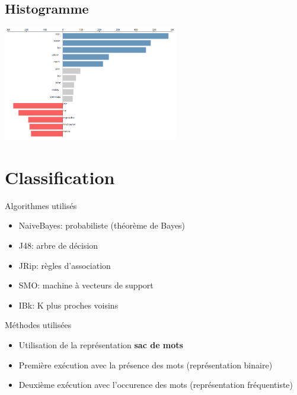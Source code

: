 \documentclass{beamer}
\begin{document}
\subsection{Histogramme}
\begin{frame}
	\includegraphics[height=5cm]{imgs/visu2.png}
\end{frame}

\section{Classification}

\begin{frame}
	\begin{block}{Algorithmes utilisés}
		\begin{itemize}
			\item NaiveBayes: probabiliste (théorème de Bayes)
			\item J48: arbre de décision
			\item JRip: règles d'association
			\item SMO: machine à vecteurs de support
			\item IBk: K plus proches voisins
		\end{itemize}
	\end{block}
\end{frame}

\begin{frame}
	\begin{block}{Méthodes utilisées}
		\begin{itemize}
			\item Utilisation de la représentation \textbf{sac de mots}
			\item Première exécution avec la présence des mots (représentation binaire)
			\item Deuxième exécution avec l'occurence des mots (représentation fréquentiste)
		\end{itemize}
	\end{block}
\end{frame}
\end{document}
